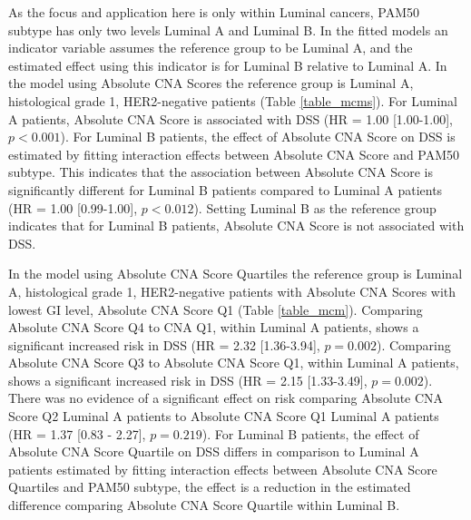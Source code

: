 As the focus and application here is only within Luminal cancers, PAM50 subtype has only two levels Luminal A and Luminal B. In the fitted models an indicator variable assumes the reference group to be Luminal A, and the estimated effect using this indicator is for Luminal B relative to Luminal A. In the model using Absolute CNA Scores the reference group is Luminal A, histological grade 1, HER2-negative patients (Table \ref{table_mcms}). For Luminal A patients, Absolute CNA Score is associated with DSS (HR = 1.00 [1.00-1.00], $p < 0.001$). For Luminal B patients, the effect of Absolute CNA Score on DSS is estimated by fitting interaction effects between Absolute CNA Score and PAM50 subtype. This indicates that the association between Absolute CNA Score is significantly different for Luminal B patients compared to Luminal A patients (HR = 1.00 [0.99-1.00], $p < 0.012$). Setting Luminal B as the reference group indicates that for Luminal B patients, Absolute CNA Score is not associated with DSS.  

In the model using Absolute CNA Score Quartiles the reference group is Luminal A, histological grade 1, HER2-negative patients with Absolute CNA Scores with lowest GI level, Absolute CNA Score Q1 (Table \ref{table_mcm}). Comparing Absolute CNA Score Q4 to CNA Q1, within Luminal A patients, shows a significant increased risk in DSS (HR = 2.32 [1.36-3.94], $p = 0.002$). Comparing Absolute CNA Score Q3 to Absolute CNA Score Q1, within Luminal A patients, shows a significant increased risk in DSS (HR = 2.15 [1.33-3.49], $p = 0.002$). There was no evidence of a significant effect on risk comparing Absolute CNA Score Q2 Luminal A patients to Absolute CNA Score Q1 Luminal A patients (HR = 1.37 [0.83 - 2.27], $p = 0.219$). For Luminal B patients, the effect of Absolute CNA Score Quartile on DSS differs in comparison to Luminal A patients estimated by fitting interaction effects between Absolute CNA Score Quartiles and PAM50 subtype, the effect is a reduction in the estimated difference comparing Absolute CNA Score Quartile within Luminal B. 



